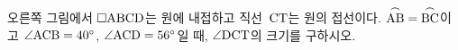 \noindent\begin{minipage}[t]{0.58\linewidth}\vspace{0pt}\raggedright 오른쪽 그림에서 $\square\mathrm{ABCD}$는 원에 내접하고 직선~$\mathrm{CT}$는 원의 접선이다. $\overset{\frown}{\mathrm{AB}}=\overset{\frown}{\mathrm{BC}}$이고 $\angle\mathrm{ACB}=40^\circ$, $\angle\mathrm{ACD}=56^\circ$일 때, $\angle\mathrm{DCT}$의 크기를 구하시오.\end{minipage}\hfill\begin{minipage}[t]{0.4\linewidth}\vspace{0pt}\centering \resizebox{\ifdim\width>\linewidth\linewidth\else\width\fi}{!}{}\end{minipage}\par
